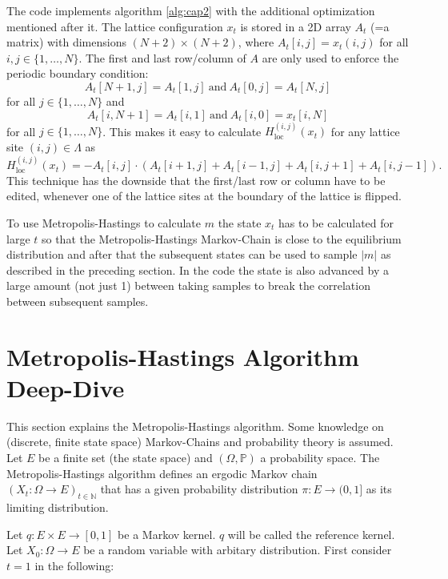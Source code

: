 \documentclass[a4paper]{article}
\begin{document}
The code implements algorithm \ref{alg:cap2} with the additional optimization mentioned after it.
The lattice configuration $x_t$ is stored in a 2D array $A_t$ (=a matrix) with dimensions $(N+2) \times (N+2)$,
where $A_t[i,j] = x_t(i,j) $ for all $i,j \in \{1, \dots, N\}$.
The first and last row/column of $A$ are only used to enforce the periodic boundary condition:
\begin{equation*}
    A_t[N+1,j]= A_t[1,j] \ \text{and} \ A_t[0,j] =A_t[N,j]
\end{equation*}
for all $j \in \{1, \dots, N\}$ and
\begin{equation}
    A_t[i,N+1]= A_t[i,1] \ \text{and} \ A_t[i,0]= x_t[i,N]
\end{equation}
for all $j \in \{1, \dots, N\}$.
This makes it easy
to calculate $H_{\mathrm{loc}}^{(i,j)}(x_t)$ for any lattice site $(i,j)\in \Lambda$ as
\begin{equation}
    H_{\mathrm{loc}}^{(i,j)}(x_t) = - A_t[i,j] \cdot  (A_t[i+1,j]+ A_t[i-1,j] + A_t[i,j+1]+ A_t[i,j-1]).
\end{equation}
This technique has the downside that the first/last row or column have to be edited,
 whenever one of the lattice sites at the boundary of the lattice is flipped.

 To use Metropolis-Hastings to calculate $m$ the state $x_t$ has to be calculated for large $t$ so that
 the Metropolis-Hastings Markov-Chain is
close to the equilibrium distribution and after that the subsequent states can be used to sample $|m|$
as described in the preceding section.
In the code the state is also advanced by a large amount (not just 1)
between taking samples to break the correlation between subsequent samples.

\section{Metropolis-Hastings Algorithm Deep-Dive}
\label{sec:3}

This section explains the Metropolis-Hastings algorithm.
Some knowledge on (discrete, finite state space) Markov-Chains and probability theory is assumed.
Let $E$ be a finite set (the state space) and $(\Omega, \mathbb{P})$ a probability space.
The Metropolis-Hastings algorithm defines an ergodic Markov chain $(X_t : \Omega \to E)_{t \in \mathbb{N}}$
that has a given
probability distribution $\pi : E\to (0,1]$ as its limiting distribution.

Let $q: E \times E \to [0,1]$ be a Markov kernel.
$q$ will be called the reference kernel.
Let $X_0: \Omega \to E$ be a random variable with arbitary distribution.
First consider $t=1$ in the following:
\end{document}
